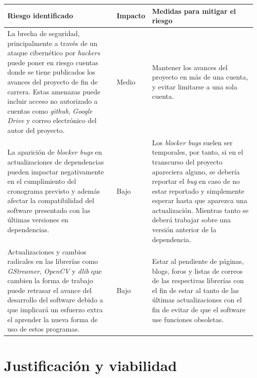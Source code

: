 \documentclass[a4paper,openright,12pt]{report}
\begin{document}
\begin{center}
  \begin{longtable}{| p{} | p{} | p{} |}
  \hline

  \textbf{Riesgo identificado} &
  \textbf{Impacto} &
  \textbf{Medidas para mitigar el riesgo}
  \\ \hline

  La brecha de seguridad, principalmente a través de un ataque cibernético por
  \textit{hackers} puede poner en riesgo cuentas donde se tiene publicados los
  avances del proyecto de fin de carrera. Estas amenazas puede incluir acceso
  no autorizado a cuentas como \textit{github}, \textit{Google Drive} y
  correo electrónico del autor del proyecto.&
  Medio&
  Mantener los avances del proyecto en más de una cuenta, y evitar limitarse
  a una sola cuenta.
  \\ \hline

  La aparición de \textit{blocker bugs} en actualizaciones de dependencias
  pueden impactar negativamente en el cumplimiento del cronograma previsto y
  además afectar la compatibilidad del software presentado con las últimas
  versiones en dependencias. &
  Bajo &
  Los \textit{blocker bugs} suelen ser temporales, por tanto, si en el
  transcurso del proyecto apareciera alguno, se debería reportar el \textit{bug}
  en caso de no estar reportado y simplemente esperar hasta que aparezca una
  actualización. Mientras tanto se deberá trabajar sobre una versión anterior
  de la dependencia.
  \\ \hline

  Actualizaciones y cambios radicales en las librerías como \textit{GStreamer},
  \textit{OpenCV} y \textit{dlib} que cambien la forma de trabajo puede retrasar
  el avance del desarrollo del software debido a que implicará un esfuerzo extra
  el aprender la nueva forma de uso de estos programas. &
  Bajo &
  Estar al pendiente de páginas, blogs, foros y listas de correos de las
  respectivas librerías con el fin de estar al tanto de las últimas
  actualizaciones con el fin de evitar de que el software use funciones
  obsoletas.
  \\ \hline

  \end{longtable}
\end{center}

\section{Justificación y viabilidad}
\end{document}
